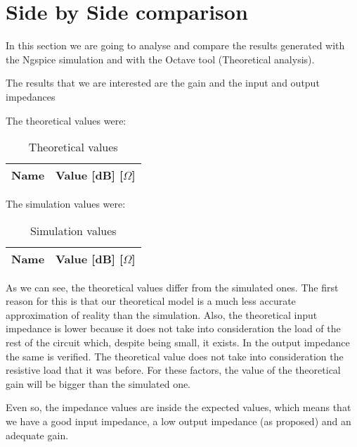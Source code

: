 \section{Side by Side comparison}
\label{sec:sidebyside}


In this section we are going to analyse and compare the results generated with the Ngspice simulation and with the Octave tool (Theoretical analysis). 

The results that we are interested are the gain and the input and output impedances

The theoretical values were:
\vspace{0.3in}
\begin{table}[ht]
  \centering
  \begin{tabular}{|l|r|}
    \hline    
    {\bf Name} & {\bf Value [dB] [$\Omega$]} \\ \hline
    
  \end{tabular}
  \caption{Theoretical values}
  \label{tab:op1q}
\end{table}

The simulation values were:
\vspace{0.3in}
\begin{table}[ht]
  \centering
  \begin{tabular}{|l|r|}
    \hline    
    {\bf Name} & {\bf Value [dB] [$\Omega$]} \\ \hline
    
  \end{tabular}
  \caption{Simulation values}
  \label{tab:op1w}
\end{table}

As we can see, the theoretical values differ from the simulated ones. 
The first reason for this is that our theoretical model is a much less accurate approximation of reality than the simulation. Also, the theoretical input impedance is lower because it does not take into consideration the load of the rest of the circuit which, despite being small, it exists.
In the output impedance the same is verified. The theoretical value does not take into consideration the resistive load that it was before. For these factors, the value of the theoretical gain will be bigger than the simulated one.

Even so, the impedance values are inside the expected values, which means that we have a good input impedance, a low output impedance (as proposed) and an adequate gain.

